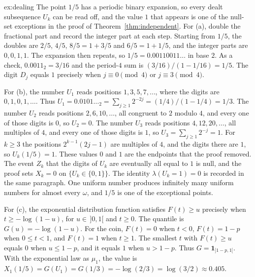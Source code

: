 \begin{solution}{ex:dealing}
\idea The point $1/5$ has a periodic binary expansion, so every dealt subsequence $U_k$ can be read off, and the value $1$ that appears is one of the null-set exceptions in the proof of Theorem~\ref{thm:independent}.
\writeup For (a), double the fractional part and record the integer part at each step.
Starting from $1/5$, the doubles are $2/5$, $4/5$, $8/5=1+3/5$ and $6/5=1+1/5$, and the integer parts are $0,0,1,1$.
The expansion then repeats, so $1/5=0.00110011\ldots$ in base $2$.
As a check, $0.0011_2=3/16$ and the period-$4$ sum is $(3/16)/(1-1/16)=1/5$.
The digit $D_j$ equals $1$ precisely when $j\equiv 0\pmod{4}$ or $j\equiv 3\pmod{4}$.

For (b), the number $U_1$ reads positions $1,3,5,7,\ldots$, where the digits are $0,1,0,1,\ldots$.
Thus $U_1=0.0101\ldots_2=\sum_{j\ge1}2^{-2j}=(1/4)/(1-1/4)=1/3$.
The number $U_2$ reads positions $2,6,10,\ldots$, all congruent to $2$ modulo $4$, and every one of those digits is $0$, so $U_2=0$.
The number $U_3$ reads positions $4,12,20,\ldots$, all multiples of $4$, and every one of those digits is $1$, so $U_3=\sum_{j\ge1}2^{-j}=1$.
For $k\ge3$ the positions $2^{k-1}(2j-1)$ are multiples of $4$, and the digits there are $1$, so $U_k(1/5)=1$.
These values $0$ and $1$ are the endpoints that the proof removed.
The event $Z_k$ that the digits of $U_k$ are eventually all equal to $1$ is null, and the proof sets $X_k=0$ on $\{U_k\in\{0,1\}\}$.
The identity $\lambda(U_k=1)=0$ is recorded in the same paragraph.
One uniform number produces infinitely many uniform numbers for almost every $\omega$, and $1/5$ is one of the exceptional points.

For (c), the exponential distribution function satisfies $F(t)\ge u$ precisely when $t\ge-\log(1-u)$, for $u\in\,]0,1[$ and $t\ge0$.
The quantile is $G(u)=-\log(1-u)$.
For the coin, $F(t)=0$ when $t<0$, $F(t)=1-p$ when $0\le t<1$, and $F(t)=1$ when $t\ge1$.
The smallest $t$ with $F(t)\ge u$ equals $0$ when $u\le 1-p$, and it equals $1$ when $u>1-p$.
Thus $G=\mathbf 1_{]1-p,1[}$.
With the exponential law as $\mu_1$, the value is $X_1(1/5)=G(U_1)=G(1/3)=-\log(2/3)=\log(3/2)\approx 0.405$.
\end{solution}

